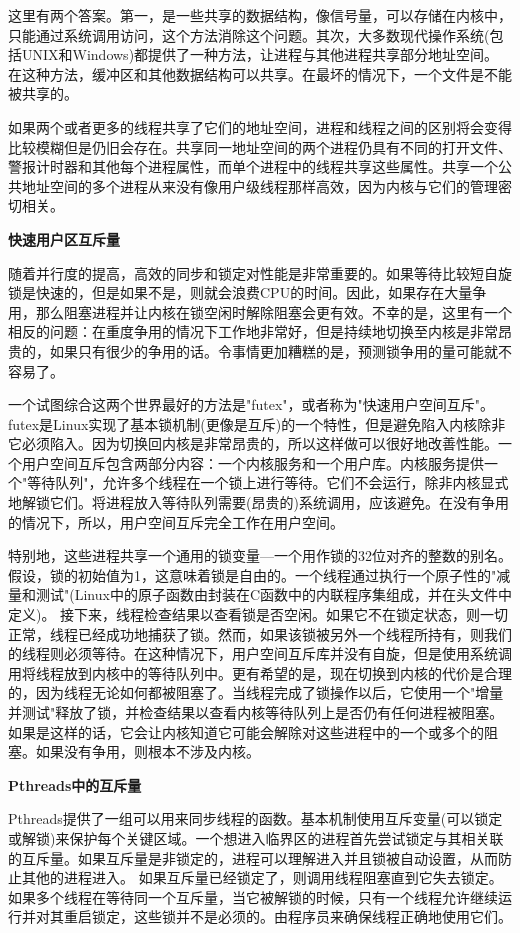 	这里有两个答案。第一，是一些共享的数据结构，像信号量，可以存储在内核中，只能通过系统调用访问，这个方法消除这个问题。其次，大多数现代操作系统(包括UNIX和Windows)都提供了一种方法，让进程与其他进程共享部分地址空间。在这种方法，缓冲区和其他数据结构可以共享。在最坏的情况下，一个文件是不能被共享的。
	
	如果两个或者更多的线程共享了它们的地址空间，进程和线程之间的区别将会变得比较模糊但是仍旧会存在。共享同一地址空间的两个进程仍具有不同的打开文件、警报计时器和其他每个进程属性，而单个进程中的线程共享这些属性。共享一个公共地址空间的多个进程从来没有像用户级线程那样高效，因为内核与它们的管理密切相关。
	
	\textbf{快速用户区互斥量}
	
	随着并行度的提高，高效的同步和锁定对性能是非常重要的。如果等待比较短自旋锁是快速的，但是如果不是，则就会浪费CPU的时间。因此，如果存在大量争用，那么阻塞进程并让内核在锁空闲时解除阻塞会更有效。不幸的是，这里有一个相反的问题：在重度争用的情况下工作地非常好，但是持续地切换至内核是非常昂贵的，如果只有很少的争用的话。令事情更加糟糕的是，预测锁争用的量可能就不容易了。
	
	一个试图综合这两个世界最好的方法是"futex"，或者称为"快速用户空间互斥"。futex是Linux实现了基本锁机制(更像是互斥)的一个特性，但是避免陷入内核除非它必须陷入。因为切换回内核是非常昂贵的，所以这样做可以很好地改善性能。一个用户空间互斥包含两部分内容：一个内核服务和一个用户库。内核服务提供一个"等待队列"，允许多个线程在一个锁上进行等待。它们不会运行，除非内核显式地解锁它们。将进程放入等待队列需要(昂贵的)系统调用，应该避免。在没有争用的情况下，所以，用户空间互斥完全工作在用户空间。
	
	特别地，这些进程共享一个通用的锁变量—一个用作锁的32位对齐的整数的别名。假设，锁的初始值为1，这意味着锁是自由的。一个线程通过执行一个原子性的"减量和测试"(Linux中的原子函数由封装在C函数中的内联程序集组成，并在头文件中定义)。 接下来，线程检查结果以查看锁是否空闲。如果它不在锁定状态，则一切正常，线程已经成功地捕获了锁。然而，如果该锁被另外一个线程所持有，则我们的线程则必须等待。在这种情况下，用户空间互斥库并没有自旋，但是使用系统调用将线程放到内核中的等待队列中。更有希望的是，现在切换到内核的代价是合理的，因为线程无论如何都被阻塞了。当线程完成了锁操作以后，它使用一个"增量并测试"释放了锁，并检查结果以查看内核等待队列上是否仍有任何进程被阻塞。如果是这样的话，它会让内核知道它可能会解除对这些进程中的一个或多个的阻塞。如果没有争用，则根本不涉及内核。
	
	\textbf{Pthreads中的互斥量}
	
	Pthreads提供了一组可以用来同步线程的函数。基本机制使用互斥变量(可以锁定或解锁)来保护每个关键区域。一个想进入临界区的进程首先尝试锁定与其相关联的互斥量。如果互斥量是非锁定的，进程可以理解进入并且锁被自动设置，从而防止其他的进程进入。
	如果互斥量已经锁定了，则调用线程阻塞直到它失去锁定。如果多个线程在等待同一个互斥量，当它被解锁的时候，只有一个线程允许继续运行并对其重启锁定，这些锁并不是必须的。由程序员来确保线程正确地使用它们。
	

